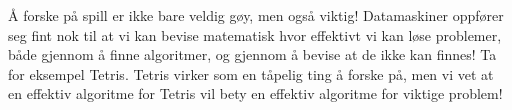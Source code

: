 
Å forske på spill er ikke bare veldig gøy, men 
også viktig! Datamaskiner oppfører seg fint nok 
til at vi kan bevise matematisk hvor effektivt vi kan 
løse problemer, både gjennom å finne algoritmer, og 
gjennom å bevise at de ikke kan finnes!
Ta for eksempel Tetris. Tetris virker som en tåpelig 
ting å forske på, men vi vet at en effektiv algoritme 
for Tetris vil bety en effektiv algoritme for viktige problem!

\PosterPara 



